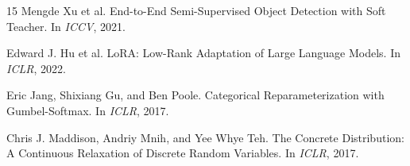 \documentclass[10pt]{article}
\begin{document}
\begin{thebibliography}{15}
Mengde Xu et al.
\newblock End-to-End Semi-Supervised Object Detection with Soft Teacher.
\newblock In \emph{ICCV}, 2021.

Edward J. Hu et al.
\newblock LoRA: Low-Rank Adaptation of Large Language Models.
\newblock In \emph{ICLR}, 2022.

Eric Jang, Shixiang Gu, and Ben Poole.
\newblock Categorical Reparameterization with Gumbel-Softmax.
\newblock In \emph{ICLR}, 2017.

Chris J. Maddison, Andriy Mnih, and Yee Whye Teh.
\newblock The Concrete Distribution: A Continuous Relaxation of Discrete Random Variables.
\newblock In \emph{ICLR}, 2017.

\end{thebibliography}
\end{document}
